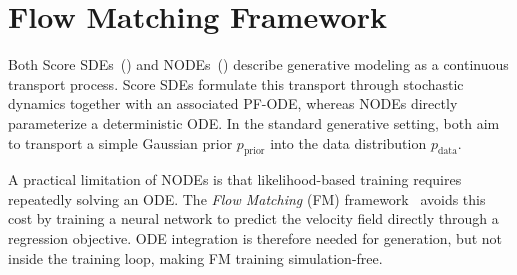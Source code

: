 





\newpage
\clearpage
\section{\texorpdfstring{Flow Matching Framework}{Flow Matching Framework}}\label{sec:flow-matching-framework}

Both Score SDEs~() and
NODEs~() describe generative modeling as a
continuous transport process. Score SDEs formulate this transport through
stochastic dynamics together with an associated PF-ODE,
whereas NODEs directly parameterize a deterministic ODE. In the standard
generative setting, both aim to transport a simple Gaussian prior
$p_{\mathrm{prior}}$ into the data distribution $p_{\mathrm{data}}$.

A practical limitation of NODEs is that likelihood-based training requires
repeatedly solving an ODE. The \emph{Flow Matching} (FM)
framework~\citep{lipman2022flow,lipman2024flow,tongimproving} avoids this
cost by training a neural network to predict the velocity field directly
through a regression objective. ODE integration is therefore needed for
generation, but not inside the training loop, making FM training
simulation-free.

